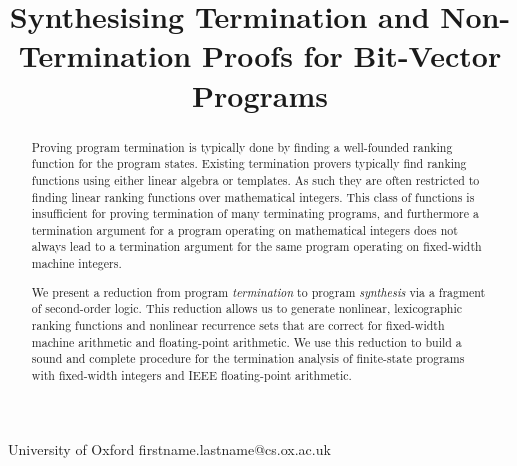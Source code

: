 \documentclass[preprint]{sigplanconf}
\theoremstyle{definition}
\begin{document}
\setlength{\pdfpageheight}{\paperheight}
\setlength{\pdfpagewidth}{\paperwidth}





\title{Synthesising Termination and Non-Termination Proofs for Bit-Vector Programs}

           {University of Oxford}
           {firstname.lastname@cs.ox.ac.uk}

\maketitle

\begin{abstract}
%
Proving program termination is typically done by finding a well-founded
ranking function for the program states.  Existing termination
provers typically find ranking functions using either linear algebra or
templates.  As such they are often restricted to finding linear ranking
functions over mathematical integers.  This class of functions is
insufficient for proving termination of many terminating programs, and
furthermore a termination argument for a program operating on mathematical
integers does not always lead to a termination argument for the same program
operating on fixed-width machine integers.

We present a reduction from program \emph{termination} to program
\emph{synthesis} via a fragment of second-order logic.  This reduction
allows us to generate nonlinear, lexicographic ranking functions and
nonlinear recurrence sets that are correct for fixed-width machine arithmetic
and floating-point arithmetic.  We use this reduction to build a sound and
complete procedure for the termination analysis of finite-state programs with fixed-width
integers and IEEE floating-point arithmetic.
%
\end{abstract}
\end{document}
